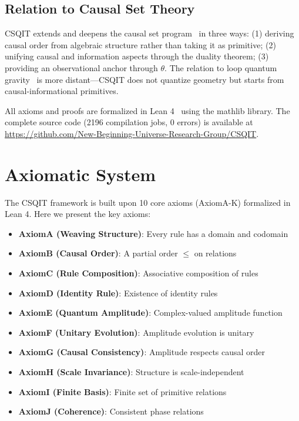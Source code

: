 \documentclass[aps,prd,twocolumn,nofootinbib,floatfix]{revtex4-2}
\begin{document}
\subsection{Relation to Causal Set Theory}

CSQIT extends and deepens the causal set program~\cite{Bombelli1987, Sorkin2005} in three ways: (1) deriving causal order from algebraic structure rather than taking it as primitive; (2) unifying causal and information aspects through the duality theorem; (3) providing an observational anchor through $\theta$. The relation to loop quantum gravity~\cite{Ambjorn1995} is more distant---CSQIT does not quantize geometry but starts from causal-informational primitives.

All axioms and proofs are formalized in Lean 4~\cite{Lean2024} using the mathlib library. The complete source code (2196 compilation jobs, 0 errors) is available at \url{https://github.com/New-Beginning-Universe-Research-Group/CSQIT}.

\section{Axiomatic System}

The CSQIT framework is built upon 10 core axioms (AxiomA-K) formalized in Lean 4. Here we present the key axioms:

\begin{itemize}
    \item \textbf{AxiomA (Weaving Structure)}: Every rule has a domain and codomain
    \item \textbf{AxiomB (Causal Order)}: A partial order $\le$ on relations
    \item \textbf{AxiomC (Rule Composition)}: Associative composition of rules
    \item \textbf{AxiomD (Identity Rule)}: Existence of identity rules
    \item \textbf{AxiomE (Quantum Amplitude)}: Complex-valued amplitude function
    \item \textbf{AxiomF (Unitary Evolution)}: Amplitude evolution is unitary
    \item \textbf{AxiomG (Causal Consistency)}: Amplitude respects causal order
    \item \textbf{AxiomH (Scale Invariance)}: Structure is scale-independent
    \item \textbf{AxiomI (Finite Basis)}: Finite set of primitive relations
    \item \textbf{AxiomJ (Coherence)}: Consistent phase relations
\end{itemize}
\end{document}
